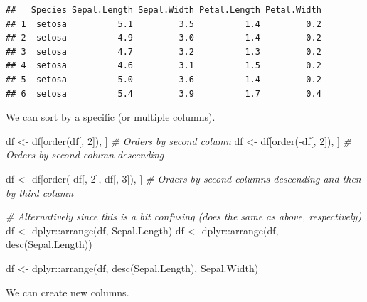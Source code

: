 \documentclass[
]{book}
\newenvironment{Shaded}{\begin{snugshade}}{\end{snugshade}}
\newcommand{\CommentTok}[1]{\textcolor[rgb]{0.56,0.35,0.01}{\textit{#1}}}
\newcommand{\DecValTok}[1]{\textcolor[rgb]{0.00,0.00,0.81}{#1}}
\newcommand{\FunctionTok}[1]{\textcolor[rgb]{0.00,0.00,0.00}{#1}}
\newcommand{\NormalTok}[1]{#1}
\newcommand{\OtherTok}[1]{\textcolor[rgb]{0.56,0.35,0.01}{#1}}
\newcommand{\SpecialCharTok}[1]{\textcolor[rgb]{0.00,0.00,0.00}{#1}}
\newcommand{\StringTok}[1]{\textcolor[rgb]{0.31,0.60,0.02}{#1}}
\begin{document}
\begin{verbatim}
##   Species Sepal.Length Sepal.Width Petal.Length Petal.Width
## 1  setosa          5.1         3.5          1.4         0.2
## 2  setosa          4.9         3.0          1.4         0.2
## 3  setosa          4.7         3.2          1.3         0.2
## 4  setosa          4.6         3.1          1.5         0.2
## 5  setosa          5.0         3.6          1.4         0.2
## 6  setosa          5.4         3.9          1.7         0.4
\end{verbatim}

We can sort by a specific (or multiple columns).

\begin{Shaded}
\begin{Highlighting}[]
\NormalTok{df }\OtherTok{\textless{}{-}}\NormalTok{ df[}\FunctionTok{order}\NormalTok{(df[, }\DecValTok{2}\NormalTok{]), ]  }\CommentTok{\# Orders by second column}
\NormalTok{df }\OtherTok{\textless{}{-}}\NormalTok{ df[}\FunctionTok{order}\NormalTok{(}\SpecialCharTok{{-}}\NormalTok{df[, }\DecValTok{2}\NormalTok{]), ]  }\CommentTok{\# Orders by second column descending}

\NormalTok{df }\OtherTok{\textless{}{-}}\NormalTok{ df[}\FunctionTok{order}\NormalTok{(}\SpecialCharTok{{-}}\NormalTok{df[, }\DecValTok{2}\NormalTok{], df[, }\DecValTok{3}\NormalTok{]), ]  }\CommentTok{\# Orders by second columns descending and then by third column}

\CommentTok{\# Alternatively since this is a bit confusing (does the same as above, respectively)}
\NormalTok{df }\OtherTok{\textless{}{-}}\NormalTok{ dplyr}\SpecialCharTok{::}\FunctionTok{arrange}\NormalTok{(df, Sepal.Length)}
\NormalTok{df }\OtherTok{\textless{}{-}}\NormalTok{ dplyr}\SpecialCharTok{::}\FunctionTok{arrange}\NormalTok{(df, }\FunctionTok{desc}\NormalTok{(Sepal.Length))}

\NormalTok{df }\OtherTok{\textless{}{-}}\NormalTok{ dplyr}\SpecialCharTok{::}\FunctionTok{arrange}\NormalTok{(df, }\FunctionTok{desc}\NormalTok{(Sepal.Length), Sepal.Width)}
\end{Highlighting}
\end{Shaded}

We can create new columns.

\begin{Shaded}
\end{Shaded}
\end{document}
